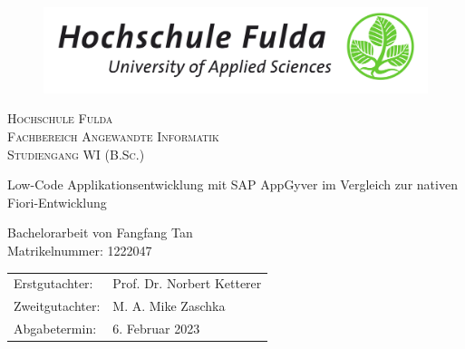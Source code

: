 

\begin{titlepage}

\begin{figure} [t!]
    \centering
    \includegraphics[width=0.75\columnwidth]{Bilder/HSFuldaLogo}
    \vspace{0.8cm}
\end{figure}

\begin{center}
  \linespread{1.3}\scshape
  \LARGE{Hochschule Fulda}\\
  \Large{Fachbereich Angewandte Informatik \\
             Studiengang WI (B.Sc.)}
\end{center}

\vspace{1.3cm}

\begin{center}
\huge\sffamily Low-Code Applikationsentwicklung mit SAP AppGyver im Vergleich zur nativen Fiori-Entwicklung
\end{center}

\vspace{1.2cm}
  
\begin{center}
\sffamily\linespread{1.3}
  \LARGE{Bachelorarbeit von Fangfang Tan}\\
  \Large{Matrikelnummer: 1222047}
\end{center}

\vspace{1.7cm}
  
\begin{center}
\sffamily\large
    \begin{tabular}{ll}
      Erstgutachter: & Prof. Dr. Norbert Ketterer \\
      Zweitgutachter: & M. A. Mike Zaschka \\
      Abgabetermin: & 6. Februar 2023
    \end{tabular}
\end{center}


\end{titlepage}

